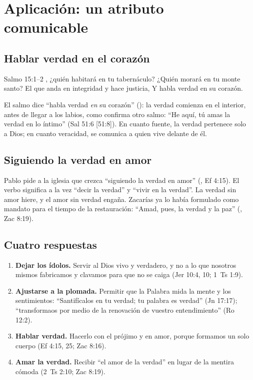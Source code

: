 \section{Aplicación: un atributo comunicable}

\subsection{Hablar verdad en el corazón}
\begin{verso}{Salmo 15:1–2}
\SENOR{}, ¿quién habitará en tu tabernáculo? ¿Quién morará en tu monte santo? El que anda en integridad y hace justicia, Y habla verdad en su corazón.
\end{verso}

El salmo dice ``habla verdad \emph{en} su corazón'' (): la verdad comienza en el interior, antes de llegar a los labios, como confirma otro salmo: ``He aquí, tú amas la verdad en lo íntimo'' (Sal 51:6 [51:8]). En cuanto fuente, la verdad pertenece solo a Dios; en cuanto veracidad, se comunica a quien vive delante de él.

\subsection{Siguiendo la verdad en amor}
Pablo pide a la iglesia que crezca ``siguiendo la verdad en amor'' (, Ef 4:15). El verbo  significa a la vez ``decir la verdad'' y ``vivir en la verdad''. La verdad sin amor hiere, y el amor sin verdad engaña. Zacarías ya lo había formulado como mandato para el tiempo de la restauración: ``Amad, pues, la verdad y la paz'' (, Zac 8:19).

\subsection{Cuatro respuestas}
\begin{enumerate}
\item \textbf{Dejar los ídolos.} Servir al Dios vivo y verdadero, y no a lo que nosotros mismos fabricamos y clavamos para que no se caiga (Jer 10:4, 10; 1~Ts 1:9).
\item \textbf{Ajustarse a la plomada.} Permitir que la Palabra mida la mente y los sentimientos: ``Santifícalos en tu verdad; tu palabra es verdad'' (Jn 17:17); ``transformaos por medio de la renovación de vuestro entendimiento'' (Ro 12:2).
\item \textbf{Hablar verdad.} Hacerlo con el prójimo y en amor, porque formamos un solo cuerpo (Ef 4:15, 25; Zac 8:16).
\item \textbf{Amar la verdad.} Recibir ``el amor de la verdad'' en lugar de la mentira cómoda (2~Ts 2:10; Zac 8:19).
\end{enumerate}

